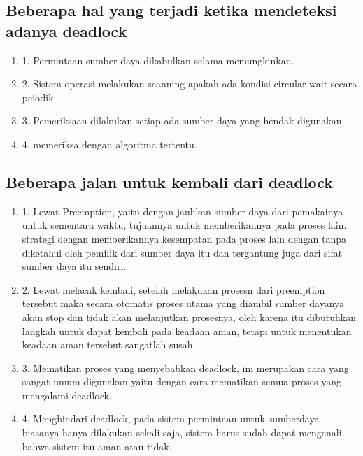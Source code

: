 \subsection {Beberapa hal yang terjadi ketika mendeteksi adanya deadlock}
\begin {enumerate}
\item
1. Permintaan sumber daya dikabulkan selama memungkinkan.
\item
2. Sistem operasi melakukan scanning apakah ada kondisi circular wait secara peiodik.
\item
3. Pemeriksaan dilakukan setiap ada sumber daya yang hendak digunakan.
\item
4. memeriksa dengan algoritma tertentu.
\end {enumerate}

\subsection {Beberapa jalan untuk kembali dari deadlock}
\begin {enumerate}
\item
1. Lewat Preemption, yaitu dengan jauhkan sumber daya dari pemakainya untuk sementara waktu, tujuannya untuk memberikannya pada proses lain. strategi dengan memberikannya kesempatan pada proses lain dengan tanpa diketahui oleh pemilik dari sumber daya itu dan tergantung juga dari sifat sumber daya itu sendiri.
\item
2. Lewat melacak kembali, setelah melakukan prosesn dari preemption tersebut maka secara otomatis proses utama yang diambil sumber dayanya akan stop dan tidak akan melanjutkan prosesnya, oleh karena itu dibutuhkan langkah untuk dapat kembali pada keadaan aman, tetapi untuk menentukan keadaan aman tersebut sangatlah susah.
\item
3. Mematikan proses yang menyebabkan deadlock, ini merupakan cara yang sangat umum digunakan yaitu dengan cara mematikan semua proses yang mengalami deadlock.
\item
4. Menghindari deadlock, pada sistem permintaan untuk sumberdaya biasanya hanya dilakukan sekali saja, sistem harus sudah dapat mengenali bahwa sistem itu aman atau tidak.
\end {enumerate}

\cite{siahaan2015penyelarasan}
\cite{fauzi2013perangkat}
\cite{silberschatz2014operating}